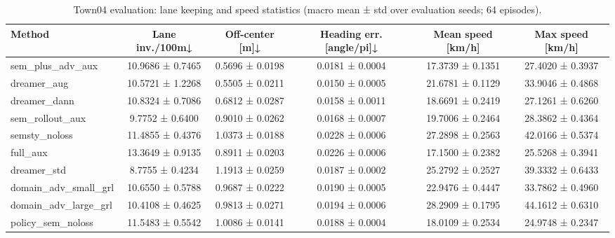 \begin{table}
\caption{Town04 evaluation: lane keeping and speed statistics (macro mean ± std over evaluation seeds; 64 episodes).}
\label{tab:town04_lane_speed}
\begin{tabular}{lccccc}
\toprule
Method & Lane inv./100m↓ & Off-center [m]↓ & Heading err. [angle/pi]↓ & Mean speed [km/h] & Max speed [km/h] \\
\midrule
sem_plus_adv_aux & 10.9686 ± 0.7465 & 0.5696 ± 0.0198 & 0.0181 ± 0.0004 & 17.3739 ± 0.1351 & 27.4020 ± 0.3937 \\
dreamer_aug & 10.5721 ± 1.2268 & 0.5505 ± 0.0211 & 0.0150 ± 0.0005 & 21.6781 ± 0.1129 & 33.9046 ± 0.4868 \\
dreamer_dann & 10.8324 ± 0.7086 & 0.6812 ± 0.0287 & 0.0158 ± 0.0011 & 18.6691 ± 0.2419 & 27.1261 ± 0.6260 \\
sem_rollout_aux & 9.7752 ± 0.6400 & 0.9010 ± 0.0262 & 0.0168 ± 0.0007 & 19.7006 ± 0.2464 & 28.3862 ± 0.4364 \\
semsty_noloss & 11.4855 ± 0.4376 & 1.0373 ± 0.0188 & 0.0228 ± 0.0006 & 27.2898 ± 0.2563 & 42.0166 ± 0.5374 \\
full_aux & 13.3649 ± 0.9135 & 0.8911 ± 0.0203 & 0.0226 ± 0.0006 & 17.1500 ± 0.2382 & 25.5268 ± 0.3941 \\
dreamer_std & 8.7755 ± 0.4234 & 1.1913 ± 0.0259 & 0.0187 ± 0.0002 & 25.2792 ± 0.2527 & 39.3332 ± 0.6433 \\
domain_adv_small_grl & 10.6550 ± 0.5788 & 0.9687 ± 0.0222 & 0.0190 ± 0.0005 & 22.9476 ± 0.4447 & 33.7862 ± 0.4960 \\
domain_adv_large_grl & 10.4108 ± 0.4625 & 0.9813 ± 0.0271 & 0.0194 ± 0.0006 & 28.2909 ± 0.1795 & 44.1612 ± 0.6310 \\
policy_sem_noloss & 11.5483 ± 0.5542 & 1.0086 ± 0.0141 & 0.0188 ± 0.0004 & 18.0109 ± 0.2534 & 24.9748 ± 0.2347 \\
\bottomrule
\end{tabular}
\end{table}
